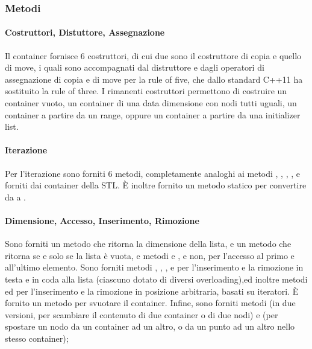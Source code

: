 \subsubsection{Metodi} %
\label{ssub:metodi}
\paragraph{Costruttori, Distuttore, Assegnazione} %
\label{par:costruttori_distuttore_assegnazione}
Il container fornisce 6 costruttori, di cui due sono il costruttore di copia e quello di move, i quali sono accompagnati dal distruttore e dagli operatori di assegnazione di copia e di move per la rule of five, che dallo standard C++11 ha sostituito la rule of three. I rimanenti costruttori permettono di costruire un container vuoto, un container di una data dimensione con nodi tutti uguali, un container a partire da un range, oppure un container a partire da una initializer list.
\paragraph{Iterazione} %
\label{par:iterazione}
Per l'iterazione sono forniti 6 metodi, completamente analoghi ai metodi , , , ,  e  forniti dai container della STL. È inoltre fornito un metodo statico  per convertire da  a .
\paragraph{Dimensione, Accesso, Inserimento, Rimozione} %
\label{par:dimensione_accesso_inserimento_rimozione}
Sono forniti un metodo  che ritorna la dimensione della lista, e un metodo  che ritorna  se e solo se la lista è vuota, e metodi  e ,  e non, per l'accesso al primo e all'ultimo elemento. Sono forniti metodi , , , e  per l'inserimento e la rimozione in testa e in coda alla lista (ciascuno dotato di diversi overloading),ed inoltre metodi  ed  per l'inserimento e la rimozione in posizione arbitraria, basati su iteratori. È fornito un metodo  per svuotare il container. Infine, sono forniti metodi  (in due versioni, per scambiare il contenuto di due container o di due nodi) e  (per spostare un nodo da un container ad un altro, o da un punto ad un altro nello stesso container);

